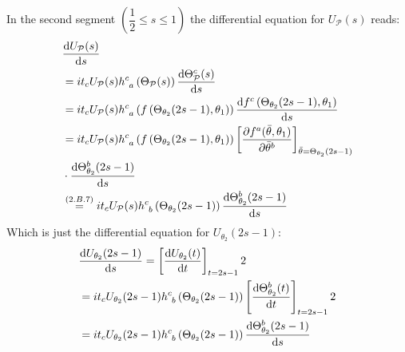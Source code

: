In the second segment $\left(\dfrac{1}{2}\leq s \leq 1\right)$ the differential equation for $U_\mathcal{P}(s)$ reads:
\begin{align*} 
	&\derivative{U_\mathcal{P}(s)}{s}\\
	&=i t_c U_\mathcal{P}(s) h^c_{\hphantom{c}a}\left(\Theta_\mathcal{P}(s)\right)\derivative{\Theta_\mathcal{P}^c(s)}{s}\\
	&=i t_c U_\mathcal{P}(s) h^c_{\hphantom{c}a}\left(f\left(\Theta_{\theta_2}(2s-1),\theta_1\right)\right)\derivative{f^c\left(\Theta_{\theta_2}(2s-1),\theta_1\right)}{s}\\
	&=i t_c U_\mathcal{P}(s) h^c_{\hphantom{c}a}\left(f\left(\Theta_{\theta_2}(2s-1),\theta_1\right)\right)\left[\partialderivative{f^a(\bar{\theta},\theta_1)}{\bar{\theta}^b}\right]_{\bar{\theta}=\Theta_{\theta_2}(2s-1)}\\
	&\cdot\derivative{\Theta_{\theta_2}^b(2s-1)}{s}\\
	&\overset{\eqc{2.B.7}}{=}i t_c U_\mathcal{P}(s)  h^c_{\hphantom{c}b}\left(\Theta_{\theta_2}(2s-1)\right)\derivative{\Theta_{\theta_2}^b(2s-1)}{s}
\end{align*}
Which is just the differential equation for $U_{\theta_2}(2s-1)$:
\begin{align*} 
	&\derivative{U_{\theta_2}(2s-1)}{s}=\left[\derivative{U_{\theta_2}(t)}{t}\right]_{t=2s-1}2\\
	&=i t_c U_{\theta_2}(2s-1)  h^c_{\hphantom{c}b}\left(\Theta_{\theta_2}(2s-1)\right)\left[\derivative{\Theta_{\theta_2}^b(t)}{t}\right]_{t=2s-1}2\\
	&=i t_c U_{\theta_2}(2s-1)  h^c_{\hphantom{c}b}\left(\Theta_{\theta_2}(2s-1)\right)\derivative{\Theta_{\theta_2}^b(2s-1)}{s}
\end{align*}


